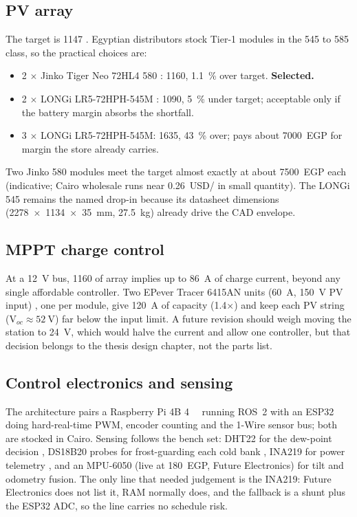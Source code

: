\documentclass[11pt,a4paper]{article}
\begin{document}
\subsection{PV array}
\label{sec:pv}
The target is \SI{1147}{\Wp} \cite{nasa_power,globalsolaratlas}. Egyptian
distributors stock Tier-1 modules in the 545 to \SI{585}{\Wp} class, so
the practical choices are:

\begin{itemize}[nosep]
  \item 2 $\times$ Jinko Tiger Neo 72HL4 \SI{580}{\Wp}
        \cite{jinko2024tigerneo}: \SI{1160}{\Wp}, \SI{1.1}{\percent} over
        target. \textbf{Selected.}
  \item 2 $\times$ LONGi LR5-72HPH-545M \cite{longi2022himo5}:
        \SI{1090}{\Wp}, \SI{5}{\percent} under target; acceptable only if
        the battery margin absorbs the shortfall.
  \item 3 $\times$ LONGi LR5-72HPH-545M: \SI{1635}{\Wp},
        \SI{43}{\percent} over; pays about \num{7000}~EGP for margin the
        store already carries.
\end{itemize}

Two Jinko \SI{580}{\Wp} modules meet the target almost exactly at about
\num{7500}~EGP each (indicative; Cairo wholesale runs near
0.26~USD/\si{\Wp} in small quantity). The LONGi 545 remains the named
drop-in because its datasheet dimensions (\SI{2278x1134x35}{\milli\metre},
\SI{27.5}{\kilo\gram}) already drive the CAD envelope.

\subsection{MPPT charge control}
At a \SI{12}{\volt} bus, \SI{1160}{\Wp} of array implies up to
\SI{86}{\ampere} of charge current, beyond any single affordable
controller. Two EPever Tracer 6415AN units (\SI{60}{\ampere},
\SI{150}{\volt} PV input) \cite{epever2023tracer}, one per module, give
\SI{120}{\ampere} of capacity (1.4$\times$) and keep each PV string
(V$_{oc}\approx\SI{52}{\volt}$) far below the input limit. A future
revision should weigh moving the station to \SI{24}{\volt}, which would
halve the current and allow one controller, but that decision belongs to
the thesis design chapter, not the parts list.

\subsection{Control electronics and sensing}
The architecture pairs a Raspberry Pi 4B \SI{4}{\giga\byte}
\cite{rpi2021brief} running ROS~2 with an ESP32 \cite{esp32ds} doing
hard-real-time PWM, encoder counting and the 1-Wire sensor bus; both are
stocked in Cairo. Sensing follows the bench set: DHT22 for the dew-point
decision \cite{dht22ds}, DS18B20 probes for frost-guarding each cold bank
\cite{ds18b20ds}, INA219 for power telemetry \cite{ina219ds}, and an
MPU-6050 \cite{mpu6050ds} (live at \num{180}~EGP, Future Electronics) for
tilt and odometry fusion. The only line that needed judgement is the
INA219: Future Electronics does not list it, RAM normally does, and the
fallback is a shunt plus the ESP32 ADC, so the line carries no schedule
risk.
\end{document}
